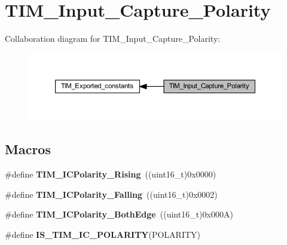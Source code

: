 \hypertarget{group___t_i_m___input___capture___polarity}{}\section{T\+I\+M\+\_\+\+Input\+\_\+\+Capture\+\_\+\+Polarity}
\label{group___t_i_m___input___capture___polarity}
Collaboration diagram for T\+I\+M\+\_\+\+Input\+\_\+\+Capture\+\_\+\+Polarity\+:
\nopagebreak
\begin{figure}[H]
\begin{center}
\leavevmode
\includegraphics[width=350pt]{group___t_i_m___input___capture___polarity}
\end{center}
\end{figure}
\subsection*{Macros}
\begin{DoxyCompactItemize}
\item 
\mbox{\label{group___t_i_m___input___capture___polarity_gabe598596b7dbcac446a4918105fa95a6}} 
\#define {\bfseries T\+I\+M\+\_\+\+I\+C\+Polarity\+\_\+\+Rising}~((uint16\+\_\+t)0x0000)
\item 
\mbox{\label{group___t_i_m___input___capture___polarity_ga70c6f5ed30a236bac4c690928e742243}} 
\#define {\bfseries T\+I\+M\+\_\+\+I\+C\+Polarity\+\_\+\+Falling}~((uint16\+\_\+t)0x0002)
\item 
\mbox{\label{group___t_i_m___input___capture___polarity_ga4632a6425d407c0d28b610b2d31cccc8}} 
\#define {\bfseries T\+I\+M\+\_\+\+I\+C\+Polarity\+\_\+\+Both\+Edge}~((uint16\+\_\+t)0x000\+A)
\item 
\#define {\bfseries I\+S\+\_\+\+T\+I\+M\+\_\+\+I\+C\+\_\+\+P\+O\+L\+A\+R\+I\+TY}(P\+O\+L\+A\+R\+I\+TY)
\end{DoxyCompactItemize}


